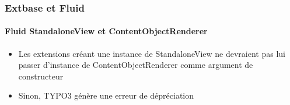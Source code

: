 %

\begin{frame}[fragile]
	\frametitle{Extbase et Fluid}
	\framesubtitle{Fluid StandaloneView et ContentObjectRenderer}


	\begin{itemize}
		\item Les extensions créant une instance de StandaloneView
			ne devraient pas lui passer d'instance de ContentObjectRenderer comme
			argument de constructeur
		\item Sinon, TYPO3 génère une erreur de dépréciation
	\end{itemize}

\end{frame}


